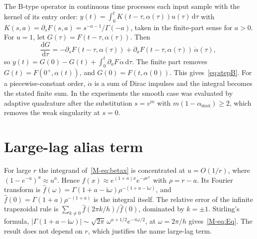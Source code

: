The B-type operator in continuous time processes each input sample with the kernel of its entry order: $y(t)=\int_0^t K(t-\tau,\alpha(\tau))u(\tau)\,\mathrm d\tau$ with $K(s,a)=\partial_sF(s,a)=s^{-a-1}/\Gamma(-a)$, taken in the finite-part sense for $a>0$. For $u=1$, let $G(\tau)=F(t-\tau,\alpha(\tau))$. Then
\[
\frac{\mathrm dG}{\mathrm d\tau}=-\partial_sF(t-\tau,\alpha(\tau))+\partial_aF(t-\tau,\alpha(\tau))\,\dot\alpha(\tau),
\]
so $y(t)=G(0)-G(t)+\int_0^t\partial_aF\,\dot\alpha\,\mathrm d\tau$. The finite part removes $G(t)=F(0^+,\alpha(t))$, and $G(0)=F(t,\alpha(0))$. This gives~\eqref{eq:stepB}. For a piecewise-constant order, $\dot\alpha$ is a sum of Dirac impulses and the integral becomes the stated finite sum. In the experiments the smooth case was evaluated by adaptive quadrature after the substitution $s=v^m$ with $m(1-\alpha_{\max})\ge2$, which removes the weak singularity at $s=0$.


\section{Large-lag alias term}\label{sup:alias}

For large $r$ the integrand of~\eqref{M-eq:betax} is concentrated at $u=O(1/r)$, where $(1-e^{-u})^a\approx u^a$. Hence $f(x)\approx e^{(1+a)x}e^{-\rho e^x}$ with $\rho=r-a$. Its Fourier transform is $\hat f(\omega)=\Gamma(1+a-\mathrm i\omega)\rho^{-(1+a-\mathrm i\omega)}$, and $\hat f(0)=\Gamma(1+a)\rho^{-(1+a)}$ is the integral itself. The relative error of the infinite trapezoidal rule is $\sum_{k\neq0}\hat f(2\pi k/h)/\hat f(0)$, dominated by $k=\pm1$. Stirling's formula, $|\Gamma(1+a-\mathrm i\omega)|\sim\sqrt{2\pi}\,\omega^{a+1/2}e^{-\pi\omega/2}$, at $\omega=2\pi/h$ gives~\eqref{M-eq:Eq}. The result does not depend on $r$, which justifies the name large-lag term.
